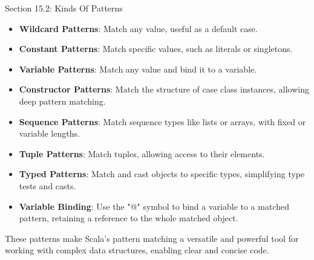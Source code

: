 \begin{notes}{Section 15.2: Kinds Of Patterns}
\begin{highlight}
    \begin{itemize}
        \item \textbf{Wildcard Patterns}: Match any value, useful as a default case.
        \item \textbf{Constant Patterns}: Match specific values, such as literals or singletons.
        \item \textbf{Variable Patterns}: Match any value and bind it to a variable.
        \item \textbf{Constructor Patterns}: Match the structure of case class instances, allowing deep pattern matching.
        \item \textbf{Sequence Patterns}: Match sequence types like lists or arrays, with fixed or variable lengths.
        \item \textbf{Tuple Patterns}: Match tuples, allowing access to their elements.
        \item \textbf{Typed Patterns}: Match and cast objects to specific types, simplifying type tests and casts.
        \item \textbf{Variable Binding}: Use the "@" symbol to bind a variable to a matched pattern, retaining a reference to the whole matched object.
    \end{itemize}
    
    These patterns make Scala's pattern matching a versatile and powerful tool for working with complex data structures, enabling clear and concise code.
    
    \end{highlight}
\end{notes}